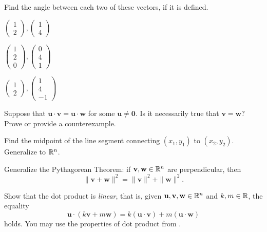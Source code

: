 \begin{exercise}{}{}
 Find the angle between each two of these vectors, if it is defined.\\[1em]
 \begin{enumerate*}[label=(\alph*),itemjoin={\hspace{2em}}]
  \item
  $
   \begin{pmatrix}
    1\\2
   \end{pmatrix},
   \begin{pmatrix}
    1\\4
   \end{pmatrix}
  $
 \item 
  $
   \begin{pmatrix}
    1\\2\\0
   \end{pmatrix},
   \begin{pmatrix}
    0\\4\\1
   \end{pmatrix}
  $
 \item 
  $
   \begin{pmatrix}
    1\\2
   \end{pmatrix},
   \begin{pmatrix}
    1\\4\\-1
   \end{pmatrix}
  $
 \end{enumerate*}
\end{exercise}

\begin{exercise}{}{}
 Suppose that $\mathbf{u} \cdot \mathbf{v} = \mathbf{u} \cdot \mathbf{w}$ for
 some $\mathbf{u} \neq \mathbf{0}$. Is it necessarily true that $\mathbf{v} =
 \mathbf{w}?$ Prove or provide a counterexample.
\end{exercise}

\begin{exercise}{}{}
 Find the midpoint of the line segment connecting $(x_1,y_1)$ to $(x_2,y_2)$.
 Generalize to $\mathbb{R}^{n}$.
\end{exercise}

\begin{exercise}{}{}
 Generalize the Pythagorean Theorem: if $\mathbf{v},\mathbf{w} \in \mathbb{R}^{n}$ are
 perpendicular, then
 \[
  \|\mathbf{v}+\mathbf{w}\|^2 = \|\mathbf{v}\|^2 + \|\mathbf{w}\|^2.
 \]
\end{exercise}

\begin{exercise}{}{}
 Show that the dot product is \emph{linear}, that is, given
 $\mathbf{u},\mathbf{v},\mathbf{w} \in \mathbb{R}^{n}$ and $k,m \in \mathbb{R}$, the equality
 \[
  \mathbf{u} \cdot (k \mathbf{v} + m \mathbf{w}) = k (\mathbf{u} \cdot
  \mathbf{v}) + m(\mathbf{u} \cdot \mathbf{w})
 \]
 holds. You may use the properties of dot product from
 .
\end{exercise}
